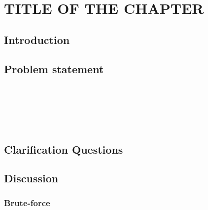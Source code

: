 %



\chapter{TITLE OF THE CHAPTER}
\label{ch:LRU_cache}
\section*{Introduction}

\section{Problem statement}
\begin{exercise}
\label{example:LRU_cache:exercice1}

	\begin{example}
		\label{example:LRU_cache:example1}
		\hfill \
	}
		
	\end{example}

	\begin{example}
		\label{example:LRU_cache:example2}
		\hfill \
		
	\end{example}

	\begin{example}
		\hfill \
	
	\label{ex:LRU_cache:example3}
	\end{example}

	\begin{example}
		\hfill \

	\label{ex:LRU_cache:example4}	
	\end{example}
\end{exercise}

\section{Clarification Questions}

\begin{QandA}
	\item 
	\begin{answered}
		\textit{}
	\end{answered}
	
\end{QandA}

\section{Discussion}
\label{LRU_cache:sec:discussion}


\subsection{Brute-force}
\label{LRU_cache:sec:bruteforce}

\begin{minipage}{\linewidth}
	
\end{minipage}

